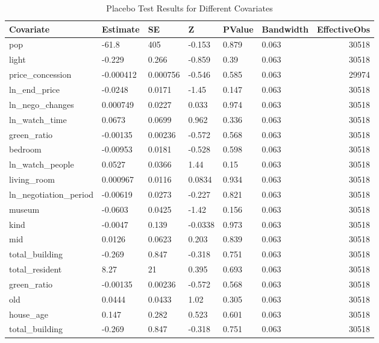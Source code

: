 \begin{table}[ht]
\centering
\begin{tabular}{llllllr}
  \hline
Covariate & Estimate & SE & Z & PValue & Bandwidth & EffectiveObs \\ 
  \hline
pop & -61.8 & 405 & -0.153 & 0.879 & 0.063 & 30518 \\ 
  light & -0.229 & 0.266 & -0.859 & 0.39 & 0.063 & 30518 \\ 
  price\_concession & -0.000412 & 0.000756 & -0.546 & 0.585 & 0.063 & 29974 \\ 
  ln\_end\_price & -0.0248 & 0.0171 & -1.45 & 0.147 & 0.063 & 30518 \\ 
  ln\_nego\_changes & 0.000749 & 0.0227 & 0.033 & 0.974 & 0.063 & 30518 \\ 
  ln\_watch\_time & 0.0673 & 0.0699 & 0.962 & 0.336 & 0.063 & 30518 \\ 
  green\_ratio & -0.00135 & 0.00236 & -0.572 & 0.568 & 0.063 & 30518 \\ 
  bedroom & -0.00953 & 0.0181 & -0.528 & 0.598 & 0.063 & 30518 \\ 
  ln\_watch\_people & 0.0527 & 0.0366 & 1.44 & 0.15 & 0.063 & 30518 \\ 
  living\_room & 0.000967 & 0.0116 & 0.0834 & 0.934 & 0.063 & 30518 \\ 
  ln\_negotiation\_period & -0.00619 & 0.0273 & -0.227 & 0.821 & 0.063 & 30518 \\ 
  museum & -0.0603 & 0.0425 & -1.42 & 0.156 & 0.063 & 30518 \\ 
  kind & -0.0047 & 0.139 & -0.0338 & 0.973 & 0.063 & 30518 \\ 
  mid & 0.0126 & 0.0623 & 0.203 & 0.839 & 0.063 & 30518 \\ 
  total\_building & -0.269 & 0.847 & -0.318 & 0.751 & 0.063 & 30518 \\ 
  total\_resident & 8.27 & 21 & 0.395 & 0.693 & 0.063 & 30518 \\ 
  green\_ratio & -0.00135 & 0.00236 & -0.572 & 0.568 & 0.063 & 30518 \\ 
  old & 0.0444 & 0.0433 & 1.02 & 0.305 & 0.063 & 30518 \\ 
  house\_age & 0.147 & 0.282 & 0.523 & 0.601 & 0.063 & 30518 \\ 
  total\_building & -0.269 & 0.847 & -0.318 & 0.751 & 0.063 & 30518 \\ 
   \hline
\end{tabular}
\caption{Placebo Test Results for Different Covariates} 
\label{tab:placebo_test_results}
\end{table}

